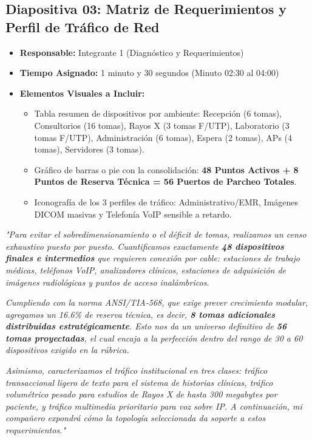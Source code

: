 \documentclass[11pt,a4paper]{article}
\begin{document}
\newpage

\subsection{Diapositiva 03: Matriz de Requerimientos y Perfil de Tráfico de Red}
\begin{itemize}[leftmargin=*]
    \item \textbf{Responsable:} Integrante 1 (Diagnóstico y Requerimientos)
    \item \textbf{Tiempo Asignado:} 1 minuto y 30 segundos (Minuto 02:30 al 04:00)
    \item \textbf{Elementos Visuales a Incluir:}
    \begin{itemize}
        \item Tabla resumen de dispositivos por ambiente: Recepción (6 tomas), Consultorios (16 tomas), Rayos X (3 tomas F/UTP), Laboratorio (3 tomas F/UTP), Administración (6 tomas), Espera (2 tomas), APs (4 tomas), Servidores (3 tomas).
        \item Gráfico de barras o pie con la consolidación: \textbf{48 Puntos Activos + 8 Puntos de Reserva Técnica = 56 Puertos de Parcheo Totales}.
        \item Iconografía de los 3 perfiles de tráfico: Administrativo/EMR, Imágenes DICOM masivas y Telefonía VoIP sensible a retardo.
    \end{itemize}
\end{itemize}

\begin{tcolorbox}[colback=white,colframe=primaryblue,title=\textbf{Speech Verbal del Integrante 1 (Guion Palabra por Palabra)}]
\textit{"Para evitar el sobredimensionamiento o el déficit de tomas, realizamos un censo exhaustivo puesto por puesto. Cuantificamos exactamente \textbf{48 dispositivos finales e intermedios} que requieren conexión por cable: estaciones de trabajo médicas, teléfonos VoIP, analizadores clínicos, estaciones de adquisición de imágenes radiológicas y puntos de acceso inalámbricos.}\par\vspace{2mm}
\textit{Cumpliendo con la norma ANSI/TIA-568, que exige prever crecimiento modular, agregamos un 16.6\% de reserva técnica, es decir, \textbf{8 tomas adicionales distribuidas estratégicamente}. Esto nos da un universo definitivo de \textbf{56 tomas proyectadas}, el cual encaja a la perfección dentro del rango de 30 a 60 dispositivos exigido en la rúbrica.}\par\vspace{2mm}
\textit{Asimismo, caracterizamos el tráfico institucional en tres clases: tráfico transaccional ligero de texto para el sistema de historias clínicas, tráfico volumétrico pesado para estudios de Rayos X de hasta 300 megabytes por paciente, y tráfico multimedia prioritario para voz sobre IP. A continuación, mi compañero expondrá cómo la topología seleccionada da soporte a estos requerimientos."}
\end{tcolorbox}
\end{document}

